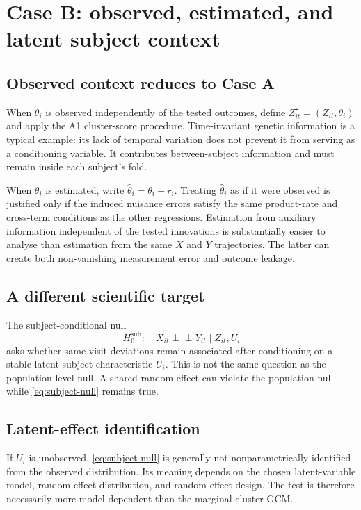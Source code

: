 \documentclass[11pt]{article}
\theoremstyle{definition}
\newcommand{\indep}{\perp\!\!\!\perp}
\begin{document}
\section{Case B: observed, estimated, and latent subject context}

\subsection{Observed context reduces to Case A}

When $\theta_i$ is observed independently of the tested outcomes, define
$Z_{it}^{\star}=(Z_{it},\theta_i)$ and apply the A1 cluster-score procedure. Time-invariant
genetic information is a typical example: its lack of temporal variation does not prevent it
from serving as a conditioning variable. It contributes between-subject information and must
remain inside each subject's fold.

When $\theta_i$ is estimated, write $\widehat\theta_i=\theta_i+r_i$. Treating
$\widehat\theta_i$ as if it were observed is justified only if the induced nuisance errors
satisfy the same product-rate and cross-term conditions as the other regressions. Estimation
from auxiliary information independent of the tested innovations is substantially easier to
analyse than estimation from the same $X$ and $Y$ trajectories. The latter can create both
non-vanishing measurement error and outcome leakage.

\subsection{A different scientific target}

The subject-conditional null
\begin{equation}
H_0^{\mathrm{sub}}:\quad
X_{it}\indep Y_{it}\mid Z_{it},U_i
\label{eq:subject-null}
\end{equation}
asks whether same-visit deviations remain associated after conditioning on a stable latent
subject characteristic $U_i$. This is not the same question as the population-level null.
A shared random effect can violate the population null while \eqref{eq:subject-null} remains
true.

\subsection{Latent-effect identification}

If $U_i$ is unobserved, \eqref{eq:subject-null} is generally not nonparametrically identified
from the observed distribution. Its meaning depends on the chosen latent-variable model,
random-effect distribution, and random-effect design. The test is therefore necessarily more
model-dependent than the marginal cluster GCM.
\end{document}
